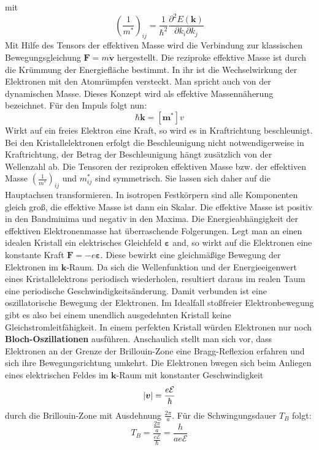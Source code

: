 \documentclass[11pt]{article}
\DeclarePairedDelimiter\abs{\lvert}{\rvert}
\begin{document}
mit
\begin{equation}
  \left(\frac{1}{m^*}\right)_{ij}=\frac{1}{\hbar^2}\frac{\partial^2E(\bm{k})}
  {\partial k_i\partial k_j}
\end{equation}
Mit Hilfe des Tensors der effektiven Masse wird die Verbindung zur klassischen
Bewegungsgleichung $\bm{F}=m\dot{\bm{v}}$ hergestellt. Die reziproke effektive
Masse ist durch die Krümmung der Energiefläche bestimmt. In ihr ist die
Wechselwirkung der Elektronen mit den Atomrümpfen versteckt. Man spricht auch
von der dynamischen Masse. Dieses Konzept wird als effektive Massennäherung
bezeichnet. Für den Impuls folgt nun:
\begin{equation}
  \hbar\bm{k}=[ \bm{m}^*] v
\end{equation}
Wirkt auf ein freies Elektron eine Kraft, so wird es in Kraftrichtung
beschleunigt. Bei den Kristallelektronen erfolgt die Beschleunigung nicht
notwendigerweise in Kraftrichtung, der Betrag der Beschleunigung hängt
zusätzlich von der Wellenzahl ab. Die Tensoren der reziproken effektiven Masse
bzw. der effektiven Masse $\left(\frac{1}{m^*}\right)_{ij}$ und $m^*_{ij}$ sind
symmetrisch. Sie lassen sich daher auf die Hauptachsen transformieren. In
isotropen Festkörpern sind alle Komponenten gleich groß, die effektive Masse ist
dann ein Skalar. Die effektive Masse ist positiv in den Bandminima und negativ
in den Maxima. Die Energieabhängigkeit der effektiven Elektronenmasse hat
überraschende Folgerungen. Legt man an einen idealen Kristall ein elektrisches
Gleichfeld $\bm{\varepsilon}$ and, so wirkt auf die Elektronen eine konstante
Kraft $\bm{F}=-e\bm{\varepsilon}$. Diese bewirkt eine gleichmäßige Bewegung
der Elektronen im $\bm{k}$-Raum. Da sich die Wellenfunktion und der
Energieeigenwert eines Kristallelektrons periodisch wiederholen, resultiert
daraus im realen Taum eine periodische Geschwindigkeitsänderung. Damit verbunden
ist eine oszillatorische Bewegung der Elektronen. Im Idealfall stoßfreier
Elektronbewegung gibt es also bei einem unendlich ausgedehnten Kristall keine
Gleichstromleitfähigkeit. In einem perfekten Kristall würden Elektronen nur noch
\textbf{Bloch-Oszillationen} ausführen. Anschaulich stellt man sich vor, dass
Elektronen an der Grenze der Brillouin-Zone eine Bragg-Reflexion erfahren und
sich ihre Bewegungsrichtung umkehrt. Die Elektronen bwegen sich beim Anliegen
eines elektrischen Feldes im $\bm{k}$-Raum mit konstanter Geschwindigkeit
\begin{equation}
  \abs{\bm{v}}=\frac{e\mathcal{E}}{\hbar}
\end{equation}
durch die Brillouin-Zone mit Ausdehnung $\frac{2\pi}{a}$. Für die
Schwingungsdauer $T_B$ folgt:
\begin{equation}
  T_B=\frac{\frac{2\pi}{a}}{\frac{e\mathcal{E}}{\hbar}}=\frac{h}{ae\mathcal{E}}
\end{equation}
\end{document}
